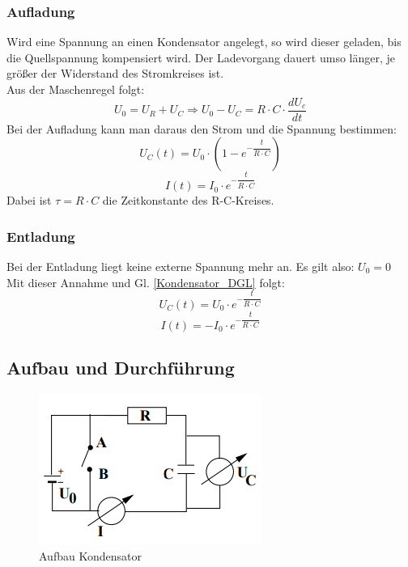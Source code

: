 \documentclass[12pt,a4paper]{article}
\begin{document}
\subsubsection{Aufladung}
Wird eine Spannung an einen Kondensator angelegt, so wird dieser geladen, bis die Quellspannung kompensiert wird. Der Ladevorgang dauert umso länger, je größer der Widerstand des Stromkreises ist.\\
Aus der Maschenregel folgt:
\begin{equation}
U_0 = U_R + U_C \Rightarrow U_0 - U_C = R\cdot C\cdot \dfrac{dU_c}{dt}
\label{Kondensator_DGL}
\end{equation}
Bei der Aufladung kann man daraus den Strom und die Spannung bestimmen:
\begin{equation}
U_C(t) = U_0 \cdot (1-e^{-\dfrac{t}{R\cdot C}})
\end{equation}
\begin{equation}
I(t) = I_0 \cdot e^{-\dfrac{t}{R\cdot C}}
\end{equation}
Dabei ist $\tau = R \cdot C$ die Zeitkonstante des R-C-Kreises.
\subsubsection{Entladung}
Bei der Entladung liegt keine externe Spannung mehr an. Es gilt also: $U_0 = 0$\\
Mit dieser Annahme und Gl. \ref{Kondensator_DGL} folgt:
\begin{equation}
U_C(t) = U_0 \cdot e^{-\dfrac{t}{R\cdot C}}
\end{equation}
\begin{equation}
I(t) = -I_0 \cdot e^{-\dfrac{t}{R\cdot C}}
\end{equation}
\subsection{Aufbau und Durchführung}
\begin{figure}
\begin{center}
\includegraphics[width=0.75\linewidth]{Bilder/Kondensator_Aufbau}
\caption[Aufbau Kondensator]{Aufbau Kondensator}
\label{fig:Kond_Aufbau}
\end{center}
\end{figure}
\end{document}

